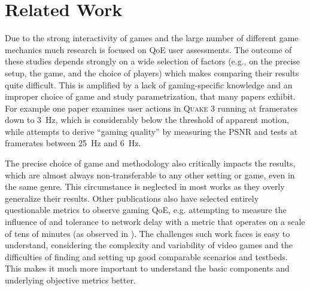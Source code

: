 \section{Related Work}
\label{sec:relatedwork}

Due to the strong interactivity of games and the large number of different game mechanics much research is focused on \gls{QoE} user assessments. The outcome of these studies depends strongly on a wide selection of factors (e.g., on the precise setup, the game, and the choice of players) which makes comparing their results quite difficult. This is amplified by a lack of gaming-specific knowledge and an improper choice of game and study parametrization, that many papers exhibit. %
For example one paper \cite{claypool2007} examines user actions in \textsc{Quake 3} running at framerates down to \SI{3}{\hertz}, which is considerably below the threshold of apparent motion, while \cite{5506572} attempts to derive ``gaming quality'' by measuring the \acrshort{PSNR} and tests at framerates between \SI{25}{\hertz} and \SI{6}{\hertz}.

The precise choice of game and methodology also critically impacts the results, which are almost always non-transferable to any other setting or game, even in the same genre. This circumstance is neglected in most works as they overly generalize their results. 
Other publications also have selected entirely questionable metrics to observe gaming \gls{QoE}, e.g. attempting to measure the influence of and tolerance to network delay with a metric that operates on a scale of tens of minutes (as observed in \cite{Claypool:2006:LPA:1167838.1167860}). The challenges such work faces is easy to understand, considering the complexity and variability of video games and the difficulties of finding and setting up good comparable scenarios and testbeds. This makes it much more important to understand the basic components and underlying objective metrics better.



